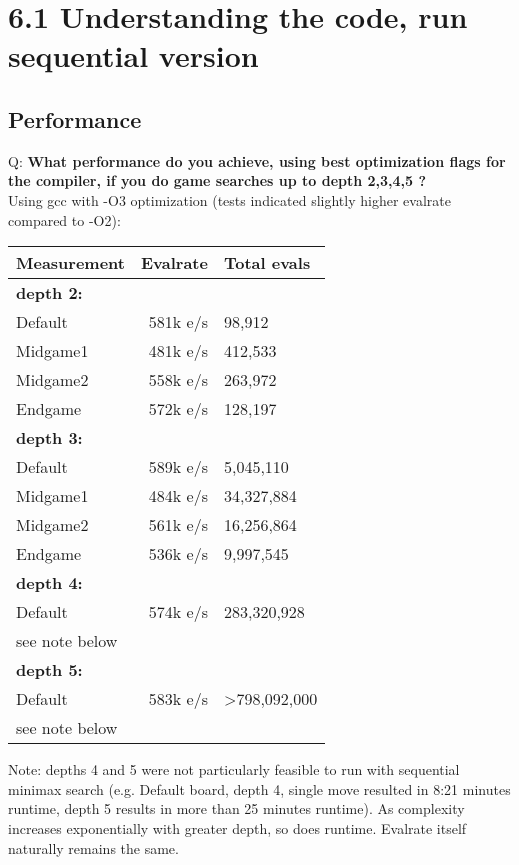 \section*{6.1 Understanding the code, run sequential version}
\subsection*{Performance}
Q: \textbf{What performance do you achieve, using best optimization flags for the compiler, if you do game searches up to depth 2,3,4,5 ?} \\
Using gcc with -O3 optimization (tests indicated slightly higher evalrate compared to -O2): 
\begin{center}

  \begin{tabular} {|l|r|l|}
    \hline
    \textbf{Measurement} & \textbf{Evalrate} & \textbf{Total evals} \\ \hline
    \textbf{depth 2:} &  &  \\ \hline
    Default & 581k e/s & 98,912 \\ \hline
    Midgame1 & 481k e/s & 412,533 \\ \hline
    Midgame2 & 558k e/s & 263,972 \\ \hline
    Endgame & 572k e/s & 128,197 \\ \hline
    \textbf{depth 3:} &  &  \\ \hline
    Default & 589k e/s & 5,045,110 \\ \hline
    Midgame1 & 484k e/s & 34,327,884 \\ \hline
    Midgame2 & 561k e/s & 16,256,864 \\ \hline
    Endgame & 536k e/s & 9,997,545 \\ \hline
    \textbf{depth 4:} &  &  \\ \hline
    Default & 574k e/s & 283,320,928 \\ \hline
    see note below &  &  \\ \hline
    \textbf{depth 5:} &  &  \\ \hline
    Default & 583k e/s & \textgreater 798,092,000 \\ \hline
    see note below &  &  \\ \hline
  \end{tabular}

\end{center}
Note: depths 4 and 5 were not particularly feasible to run with sequential minimax search (e.g. Default board, depth 4, single move resulted in 8:21 minutes runtime, depth 5 results in more than 25 minutes runtime). As complexity increases exponentially with greater depth, so does runtime. Evalrate itself naturally remains the same.
